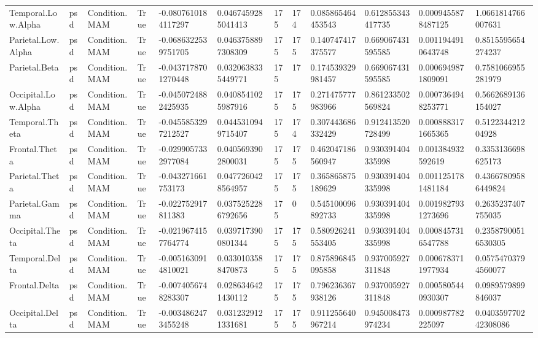 \begin{longtable}{llllllllllll}
Temporal.Low.Alpha & psd & Condition.MAM & True & -0.0807610184117297 & 0.0467459285041413 & 175 & 174 & 0.085865464453543 & 0.612855343417735 & 0.0009455878487125 & 1.0661814766007631 \\
Parietal.Low.Alpha & psd & Condition.MAM & True & -0.0686322539751705 & 0.0463758897308309 & 175 & 175 & 0.140747417375577 & 0.669067431595585 & 0.0011944910643748 & 0.8515595654274237 \\
Parietal.Beta & psd & Condition.MAM & True & -0.0437178701270448 & 0.0320638335449771 & 175 & 17 & 0.174539329981457 & 0.669067431595585 & 0.0006949871809091 & 0.7581066955281979 \\
Occipital.Low.Alpha & psd & Condition.MAM & True & -0.0450724882425935 & 0.0408541025987916 & 175 & 175 & 0.271475777983966 & 0.861233502569824 & 0.0007364948253771 & 0.5662689136154027 \\
Temporal.Theta & psd & Condition.MAM & True & -0.0455853297212527 & 0.0445310949715407 & 175 & 174 & 0.307443686332429 & 0.912413520728499 & 0.0008883171665365 & 0.512234421204928 \\
Frontal.Theta & psd & Condition.MAM & True & -0.0299057332977084 & 0.0405693902800031 & 175 & 175 & 0.462047186560947 & 0.930391404335998 & 0.001384932592619 & 0.3353136698625173 \\
Parietal.Theta & psd & Condition.MAM & True & -0.043271661753173 & 0.0477260428564957 & 175 & 175 & 0.365865875189629 & 0.930391404335998 & 0.0011251781481184 & 0.43667809586449824 \\
Parietal.Gamma & psd & Condition.MAM & True & -0.022752917811383 & 0.0375252286792656 & 175 & 0 & 0.545100096892733 & 0.930391404335998 & 0.0019827931273696 & 0.2635237407755035 \\
Occipital.Theta & psd & Condition.MAM & True & -0.0219674157764774 & 0.0397173900801344 & 175 & 175 & 0.580926241553405 & 0.930391404335998 & 0.0008457316547788 & 0.23587900516530305 \\
Temporal.Delta & psd & Condition.MAM & True & -0.0051630914810021 & 0.0330103588470873 & 175 & 175 & 0.875896845095858 & 0.937005927311848 & 0.0006783711977934 & 0.05754703794560077 \\
Frontal.Delta & psd & Condition.MAM & True & -0.0074056748283307 & 0.0286346421430112 & 175 & 175 & 0.796236367938126 & 0.937005927311848 & 0.0005805440930307 & 0.0989579899846037 \\
Occipital.Delta & psd & Condition.MAM & True & -0.0034862473455248 & 0.0312329121331681 & 175 & 175 & 0.911255640967214 & 0.945008473974234 & 0.000987782225097 & 0.040359770242308086 \\

\end{longtable}
